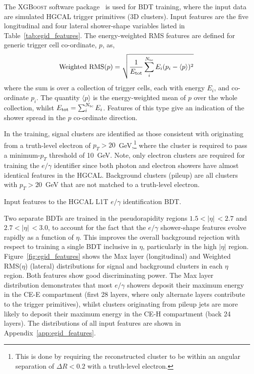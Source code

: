 The \textsc{XGBoost} software package~\cite{10.1145/2939672.2939785} is used for BDT training, where the input data are simulated HGCAL trigger primitives (3D clusters). Input features are the five longitudinal and four lateral shower-shape variables listed in Table~\ref{tab:egid_features}. The energy-weighted RMS features are defined for generic trigger cell co-ordinate, $p$, as,
\begin{equation}
    {\rm{Weighted}\,\,\rm{RMS}}(p) = \sqrt{\frac{1}{E_{\rm{tot}}}\sum^{N_{\rm{tc}}}_{i} E_i (p_i-\langle p \rangle)^2}\,
\end{equation}
\noindent
where the sum is over a collection of trigger cells, each with energy $E_i$, and co-ordinate $p_i$. The quantity $\langle p \rangle$ is the energy-weighted mean of $p$ over the whole collection, whilst $E_{\rm{tot}}=\sum^{N_{\rm{tc}}}_iE_i$. Features of this type give an indication of the shower spread in the $p$ co-ordinate direction.

In the training, signal clusters are identified as those consistent with originating from a truth-level electron of $p_T > 20$~GeV,\footnote{This is done by requiring the reconstructed cluster to be within an angular separation of $\Delta R<0.2$ with a truth-level electron.} where the cluster is required to pass a minimum-$p_T$ threshold of 10~GeV. Note, only electron clusters are required for training the $e/\gamma$ identifier since both photon and electron showers have almost identical features in the HGCAL. Background clusters (pileup) are all clusters with $p_T>20$~GeV that are not matched to a truth-level electron. 

\begin{table}
    \caption[HGCAL L1T $e/\gamma$ identification BDT input features]{Input features to the HGCAL L1T $e/\gamma$ identification BDT.}
    \label{tab:egid_features}
    \centering
    \scriptsize
    \renewcommand{\arraystretch}{2}
    \hspace*{-1.5cm}
    
    \hspace*{-1.5cm}
\end{table}

Two separate BDTs are trained in the pseudorapidity regions $1.5<|\eta|\,<2.7$ and $2.7<|\eta|\,<3.0$, to account for the fact that the $e/\gamma$ shower-shape features evolve rapidly as a function of $\eta$. This improves the overall background rejection with respect to training a single BDT inclusive in $\eta$, particularly in the high $|\eta|$ region. Figure~\ref{fig:egid_features} shows the Max layer (longitudinal) and Weighted RMS($\eta$) (lateral) distributions for signal and background clusters in each $\eta$ region. Both features show good discriminating power. The Max layer distribution demonstrates that most $e/\gamma$ showers deposit their maximum energy in the CE-E compartment (first 28 layers, where only alternate layers contribute to the trigger primitives), whilst clusters originating from pileup jets are more likely to deposit their maximum energy in the CE-H compartment (back 24 layers). The distributions of all input features are shown in Appendix~\ref{app:egid_features}.

